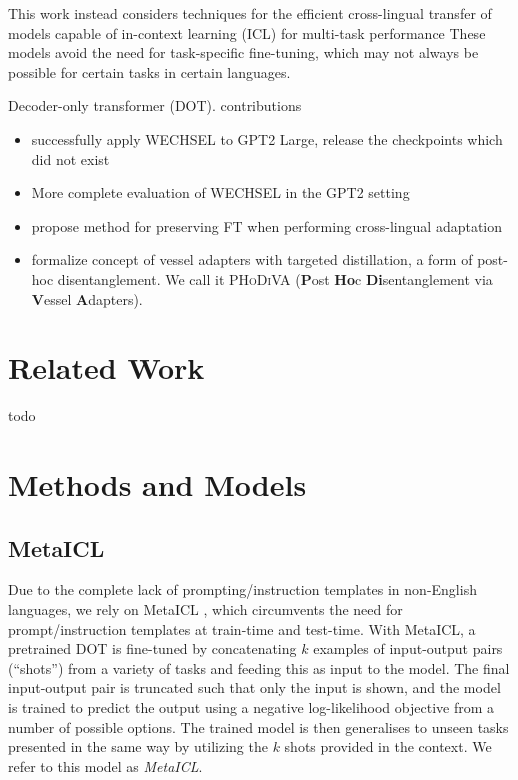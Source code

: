 \documentclass[11pt]{article}
\begin{document}
This work instead considers techniques for the efficient cross-lingual transfer of models capable
of in-context learning (ICL) for multi-task performance \citep{min_metaicl_2022} These models avoid
the need for task-specific fine-tuning, which may not always be possible for certain tasks in
certain languages.

Decoder-only transformer (DOT).
contributions
\begin{itemize}
	\item successfully apply WECHSEL to GPT2 Large, release the checkpoints which did not exist
	\item More complete evaluation of WECHSEL in the GPT2 setting
	\item propose method for preserving FT when performing cross-lingual adaptation
	\item formalize concept of vessel adapters with targeted distillation, a form of post-hoc
	      disentanglement. We call it \textsc{PHoDiVA} (\textbf{P}ost \textbf{Ho}c
	      \textbf{Di}sentanglement via \textbf{V}essel \textbf{A}dapters).
\end{itemize}

\section{Related Work}

todo

\section{Methods and Models}\label{sec:method}

\subsection{MetaICL}

Due to the complete lack of prompting/instruction templates in non-English languages, we rely on
MetaICL \citep{min_metaicl_2022}, which circumvents the need for prompt/instruction templates at
train-time and test-time. With MetaICL, a pretrained DOT is fine-tuned by concatenating $k$ examples
of input-output pairs (``shots'') from a variety of tasks and feeding this as input to the model.
The final input-output pair is truncated such that only the input is shown, and the model is trained
to predict the output using a negative log-likelihood objective from a number of possible options.
The trained model is then generalises to unseen tasks presented in the same way by utilizing the $k$
shots provided in the context.  We refer to this model as \textit{MetaICL}.
\end{document}
